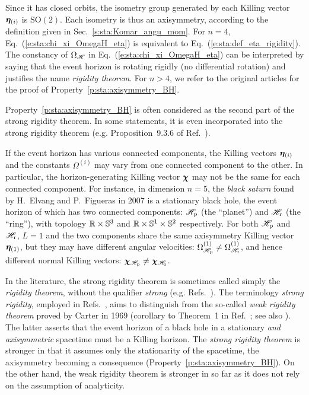 Since it has closed orbits, the isometry group generated by each Killing vector
$\bm{\eta}_{(i)}$ is $\mathrm{SO}(2)$. Each isometry is thus an axisymmetry,
according to the definition given in Sec.~\ref{s:sta:Komar_angu_mom}.
For $n=4$, Eq.~(\ref{e:sta:chi_xi_OmegaH_eta}) is
equivalent to Eq.~(\ref{e:sta:def_eta_rigidity}).
The constancy of $\Omega_{\mathscr{H}}$ in Eq.~(\ref{e:sta:chi_xi_OmegaH_eta})
can be interpreted by saying that the event horizon is rotating rigidly
(no differential rotation) and justifies the name \emph{rigidity theorem}.
For $n>4$, we refer
to the original articles \cite{HollaIW07,MoncrI08} for the proof
of Property~\ref{p:sta:axisymmetry_BH}.

\begin{remark}
Property~\ref{p:sta:axisymmetry_BH} is often considered as the second part
of the strong rigidity theorem. In some statements, it is even incorporated
into the strong rigidity theorem (e.g. Proposition~9.3.6 of Ref.~\cite{HawkiE73}).
\end{remark}

\begin{remark}
\label{r:sta:dep_eta_Omega}
If the event horizon has various connected components, the Killing vectors
$\bm{\eta}_{(i)}$ and the constants $\Omega^{(i)}$ may vary from one connected
component to the other. In particular, the horizon-generating Killing vector $\bm{\chi}$
may not be the same for each connected component. For instance,
in dimension $n=5$, the \emph{black saturn}
found by H.~Elvang and P.~Figueras in 2007 \cite{ElvanF07}
is a stationary black hole, the event horizon of which has two connected
components: $\mathscr{H}_{\rm p}$ (the ``planet'') and $\mathscr{H}_{\rm r}$ (the ``ring''),
with topology $\mathbb{R}\times\mathbb{S}^3$ and $\mathbb{R}\times\mathbb{S}^1\times\mathbb{S}^2$ respectively.
For both $\mathscr{H}_{\rm p}$ and $\mathscr{H}_{\rm r}$, $L=1$ and
the two components share the same axisymmetry Killing vector $\bm{\eta}_{(1)}$,
but they may have different angular velocities:
$\Omega^{(1)}_{\mathscr{H}_{\rm p}} \neq \Omega^{(1)}_{\mathscr{H}_{\rm r}}$, and hence
different normal Killing vectors: $\bm{\chi}_{\mathscr{H}_{\rm p}} \neq \bm{\chi}_{\mathscr{H}_{\rm r}}$.
\end{remark}

In the literature, the strong rigidity theorem is sometimes called
simply the \emph{rigidity theorem}, without the qualifier \emph{strong}
(e.g. Refs.~\cite{Choqu09,HollaI12}).
The terminology \emph{strong rigidity}, employed in Refs.~\cite{Carte99,ChrusLH12,Heusl96},
aims to distinguish from the so-called
\emph{weak rigidity theorem}
proved by Carter in 1969 (corollary to Theorem~1 in Ref.~\cite{Carte69}; see also \cite{Carte72}). The latter asserts that the event horizon of a black hole in a stationary \emph{and axisymmetric}
spacetime must be a Killing horizon. The \emph{strong rigidity theorem} is
stronger in that it assumes only the stationarity of the spacetime, the axisymmetry
becoming a consequence (Property~\ref{p:sta:axisymmetry_BH}). On the other hand,
the weak rigidity theorem is stronger in so far as it does not rely on the
assumption of analyticity.

